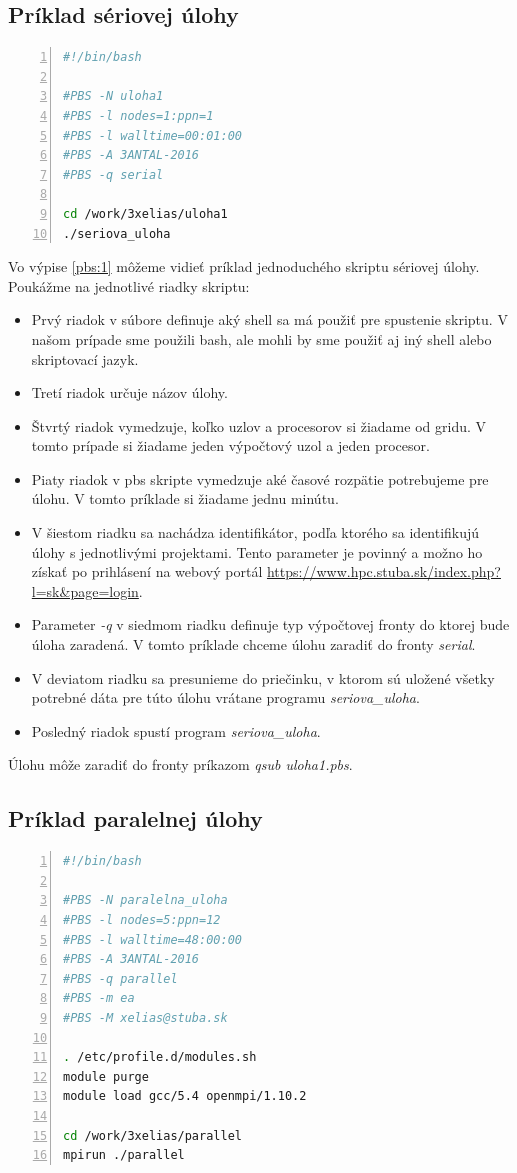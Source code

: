 \subsection{Príklad sériovej úlohy}

\begin{lstlisting}[language=bash, caption={uloha1.pbs}, label={pbs:1}, numbers=left]
#!/bin/bash

#PBS -N uloha1
#PBS -l nodes=1:ppn=1
#PBS -l walltime=00:01:00  
#PBS -A 3ANTAL-2016
#PBS -q serial

cd /work/3xelias/uloha1
./seriova_uloha
\end{lstlisting}

Vo výpise \ref{pbs:1} môžeme vidieť príklad jednoduchého skriptu sériovej úlohy.
Poukážme na jednotlivé riadky skriptu:
\begin{itemize}
\item
  Prvý riadok v súbore definuje aký shell sa má použiť pre spustenie skriptu.
  V našom prípade sme použili \acrshort{bash}, ale mohli by sme použiť aj iný shell alebo skriptovací jazyk.
\item
  Tretí riadok určuje názov úlohy.
\item
  Štvrtý riadok vymedzuje, koľko uzlov a procesorov si žiadame od gridu.
  V tomto prípade si žiadame jeden výpočtový uzol a jeden procesor.
\item
  Piaty riadok v \acrshort{pbs} skripte vymedzuje aké časové rozpätie potrebujeme pre úlohu.
  V tomto príklade si žiadame jednu minútu.
\item
  V šiestom riadku sa nachádza identifikátor, podľa ktorého sa identifikujú úlohy s jednotlivými projektami.
  Tento parameter je povinný a možno ho získať po prihlásení na webový portál \url{https://www.hpc.stuba.sk/index.php?l=sk&page=login}.
\item
  Parameter \textit{-q} v siedmom riadku definuje typ výpočtovej fronty do ktorej bude úloha zaradená.
  V tomto príklade chceme úlohu zaradiť do fronty \textit{serial}.
\item
  V deviatom riadku sa presunieme do priečinku, v ktorom sú uložené všetky potrebné dáta pre túto úlohu vrátane programu \textit{seriova\_uloha}.
\item
  Posledný riadok spustí program \textit{seriova\_uloha}.
\end{itemize}
Úlohu môže zaradiť do fronty príkazom \textit{qsub uloha1.pbs}.

\subsection{Príklad paralelnej úlohy}
\begin{lstlisting}[language=bash, caption={uloha2.pbs}, label={pbs:2}, numbers=left]
#!/bin/bash

#PBS -N paralelna_uloha
#PBS -l nodes=5:ppn=12
#PBS -l walltime=48:00:00  
#PBS -A 3ANTAL-2016
#PBS -q parallel
#PBS -m ea
#PBS -M xelias@stuba.sk

. /etc/profile.d/modules.sh
module purge
module load gcc/5.4 openmpi/1.10.2

cd /work/3xelias/parallel
mpirun ./parallel
\end{lstlisting}

